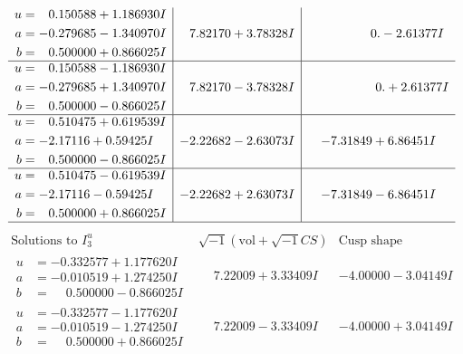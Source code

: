 \documentclass[1p]{elsarticle_modified}
\theoremstyle{definition}
\newcommand{\I}{\sqrt{-1}}
\begin{document}
$$\begin{array}{c|c|c}
\begin{aligned}
u &= \phantom{-}0.150588 + 1.186930 I \\
a &= -0.279685 - 1.340970 I \\
b &= \phantom{-}0.500000 + 0.866025 I\end{aligned}
 & \phantom{-}7.82170 + 3.78328 I & \phantom{-0.000000 } 0. - 2.61377 I \\ \hline\begin{aligned}
u &= \phantom{-}0.150588 - 1.186930 I \\
a &= -0.279685 + 1.340970 I \\
b &= \phantom{-}0.500000 - 0.866025 I\end{aligned}
 & \phantom{-}7.82170 - 3.78328 I & \phantom{-0.000000 -}0. + 2.61377 I \\ \hline\begin{aligned}
u &= \phantom{-}0.510475 + 0.619539 I \\
a &= -2.17116 + 0.59425 I \\
b &= \phantom{-}0.500000 - 0.866025 I\end{aligned}
 & -2.22682 - 2.63073 I & -7.31849 + 6.86451 I \\ \hline\begin{aligned}
u &= \phantom{-}0.510475 - 0.619539 I \\
a &= -2.17116 - 0.59425 I \\
b &= \phantom{-}0.500000 + 0.866025 I\end{aligned}
 & -2.22682 + 2.63073 I & -7.31849 - 6.86451 I\\
 \hline 
 \end{array}$$\newpage$$\begin{array}{c|c|c}  
\text{Solutions to }I^u_{3}& \I (\text{vol} + \sqrt{-1}CS) & \text{Cusp shape}\\
 \hline 
\begin{aligned}
u &= -0.332577 + 1.177620 I \\
a &= -0.010519 + 1.274250 I \\
b &= \phantom{-}0.500000 - 0.866025 I\end{aligned}
 & \phantom{-}7.22009 + 3.33409 I & -4.00000 - 3.04149 I \\ \hline\begin{aligned}
u &= -0.332577 - 1.177620 I \\
a &= -0.010519 - 1.274250 I \\
b &= \phantom{-}0.500000 + 0.866025 I\end{aligned}
 & \phantom{-}7.22009 - 3.33409 I & -4.00000 + 3.04149 I \\ \hline\begin{aligned}

\end{aligned}
\end{array}$$
\end{document}
